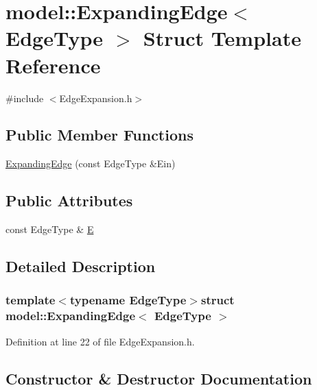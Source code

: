 \hypertarget{structmodel_1_1_expanding_edge}{}\section{model\+:\+:Expanding\+Edge$<$ Edge\+Type $>$ Struct Template Reference}
\label{structmodel_1_1_expanding_edge}


{\ttfamily \#include $<$Edge\+Expansion.\+h$>$}

\subsection*{Public Member Functions}
\begin{DoxyCompactItemize}
\item 
\hyperlink{structmodel_1_1_expanding_edge_a3acf9c60db675701a5b6df1517b54075}{Expanding\+Edge} (const Edge\+Type \&Ein)
\end{DoxyCompactItemize}
\subsection*{Public Attributes}
\begin{DoxyCompactItemize}
\item 
const Edge\+Type \& \hyperlink{structmodel_1_1_expanding_edge_a845fc3adc5962357d702a94380a7f4e3}{E}
\end{DoxyCompactItemize}


\subsection{Detailed Description}
\subsubsection*{template$<$typename Edge\+Type$>$struct model\+::\+Expanding\+Edge$<$ Edge\+Type $>$}



Definition at line 22 of file Edge\+Expansion.\+h.



\subsection{Constructor \& Destructor Documentation}
\hypertarget{structmodel_1_1_expanding_edge_a3acf9c60db675701a5b6df1517b54075}{}
